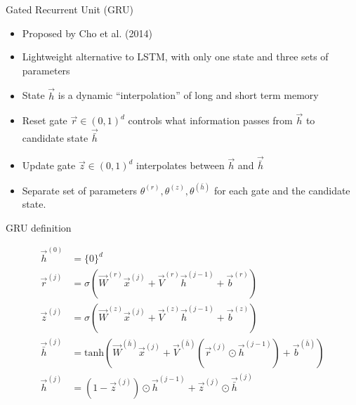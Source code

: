 
\iffalse

\begin{vbframe}{Gated Recurrent Unit (GRU)}

\vfill

\begin{itemize}
	\item Proposed by Cho et al. (2014)
	\item Lightweight alternative to LSTM, with only one state and three sets of parameters
	\item State $\vec h$ is a dynamic ``interpolation'' of long and short term memory
	\item Reset gate $\vec r \in (0,1)^d$ controls what information passes from $\vec h$ to candidate state $\vec {\bar{h}}$
	\item Update gate $\vec z \in (0,1)^d$ interpolates between $\vec h$ and $\vec {\bar{h}}$
	\item Separate set of parameters $\theta^{(r)}, \theta^{(z)}, \theta^{(\bar{h})}$ for each gate and the candidate state.
\end{itemize}

\vfill

\end{vbframe}


\begin{vbframe}{GRU definition}

\vfill

$$
\begin{aligned}
\vec h^{(0)} & = \{0\}^d \\
\vec r^{(j)} & = \sigma(\vec W^{(r)} \vec x^{(j)} + \vec V^{(r)} \vec h^{(j-1)} + \vec b^{(r)}) \\
\vec z^{(j)} & = \sigma(\vec W^{(z)} \vec x^{(j)} + \vec V^{(z)} \vec h^{(j-1)} + \vec b^{(z)}) \\
\vec {\bar{h}}^{(j)} & = \mathrm{tanh}(\vec W^{(\bar{h})} \vec x^{(j)} + \vec V^{(\bar{h})} (\vec r^{(j)} \odot \vec h^{(j-1)}) + \vec b^{(\bar{h})}) \\
\vec h^{(j)} &= (1-\vec z^{(j)}) \odot \vec h^{(j-1)} + \vec z^{(j)} \odot \vec {\bar{h}}^{(j)} \\
\end{aligned}
$$

\vfill

\end{vbframe}

